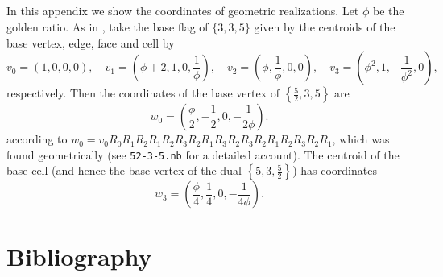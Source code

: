 \documentclass{article}
\theoremstyle{definition}
\begin{document}
\begin{appendices}
\section{}\label{app:coords}
In this appendix we show the coordinates of geometric realizations. Let $\phi$ be the golden ratio. As in \cite{petcox}, take the base flag of $\{3,3,5\}$ given by the centroids of the base vertex, edge, face and cell by
\[v_0=(1, 0, 0, 0),\quad v_1=\left(\phi+2,1,0,\frac{1}{\phi }\right), \quad v_2=\left(\phi,\frac{1}{\phi },0,0\right),\quad v_3=\left(\phi ^2,1,-\frac{1}{\phi ^2},0\right),\]
respectively. Then the coordinates of the base vertex of $\left\{\frac{5}{2},3,5\right\}$ are
\[w_0=\left(\frac{\phi }{2}, -\frac{1}{2}, 0, -\frac{1}{2 \phi }\right).\]
according to $w_0=v_0R_0R_1R_2R_1R_2R_3R_2R_1 R_3R_2R_3R_2R_1R_2R_3R_2R_1$, which was found geometrically (see \texttt{52-3-5.nb} for a detailed account). The centroid of the base cell (and hence the base vertex of the dual $\left\{5,3,\frac{5}{2}\right\}$) has coordinates
\[w_3=\left(\frac{\phi }{4}, \frac{1}{4}, 0,-\frac{1}{4 \phi }\right).\]
\end{appendices}

\section*{Bibliography}

\printbibliography[heading=none]
\end{document}
